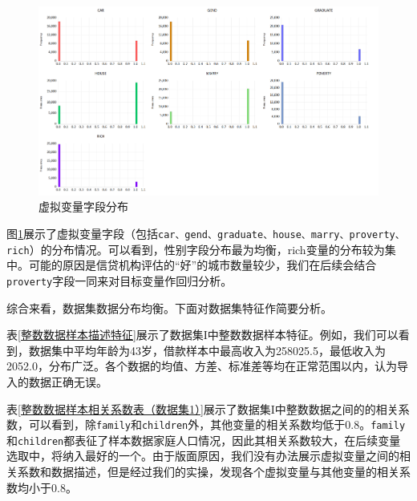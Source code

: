 \documentclass[13.5pt,hyperref,a4paper,UTF8]{ctexart}
\begin{document}
\begin{figure}[H]
    \centering
    \includegraphics[width =1\textwidth]{figures/2DATABASE/数据集I虚拟变量字段分布.png}
    \caption{虚拟变量字段分布}
    \label{虚拟变量字段分布}
\end{figure}


\indent 图\ref{虚拟变量字段分布}展示了虚拟变量字段（包括\texttt{car、gend、graduate、house、marry、proverty、rich}）的分布情况。可以看到，性别字段分布最为均衡，rich变量的分布较为集中。可能的原因是信贷机构评估的“好”的城市数量较少，我们在后续会结合\texttt{proverty}字段一同来对目标变量作回归分析。

综合来看，数据集数据分布均衡。下面对数据集特征作简要分析。

表\ref{整数数据样本描述特征}展示了数据集I中整数数据样本特征。例如，我们可以看到，数据集中平均年龄为43岁，借款样本中最高收入为258025.5，最低收入为2052.0，分布广泛。各个数据的均值、方差、标准差等均在正常范围以内，认为导入的数据正确无误。

表\ref{整数数据样本相关系数表（数据集1）}展示了数据集I中整数数据之间的的相关系数，可以看到，除\texttt{family}和\texttt{children}外，其他变量的相关系数均低于0.8。\texttt{family}和\texttt{children}都表征了样本数据家庭人口情况，因此其相关系数较大，在后续变量选取中，将纳入最好的一个。由于版面原因，我们没有办法展示虚拟变量之间的相关系数和数据描述，但是经过我们的实操，发现各个虚拟变量与其他变量的相关系数均小于0.8。
\end{document}
